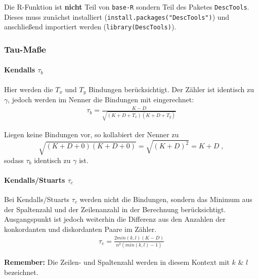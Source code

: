 \documentclass[a4paper]{article}
\newcommand\dangersign{%
 \makebox[1.8em][c]{%
 \makebox[0pt][c]{\raisebox{.15em}{\small!}}%
 \makebox[0pt][c]{\color{red}\Large$\triangle$}}}%
\begin{document}
\noindent \dangersign Die R-Funktion ist \textbf{nicht} Teil von \texttt{base-R} sondern Teil des Paketes \texttt{DescTools}. Dieses muss zunächst installiert (\texttt{install.packages("DescTools")}) und anschließend importiert werden (\texttt{library(DescTools)}).

\clearpage

\subsubsection{Tau-Maße}\label{sec:tau}

\paragraph{Kendalls $\tau_b$}
Hier werden die $T_x$ und $T_y$ Bindungen berücksichtigt. Der Zähler ist identisch zu $\gamma$, jedoch werden im Nenner die Bindungen mit eingerechnet:
\begin{align*}
    \tau_b = \frac{K-D}{\sqrt{(K+D+T_x)(K+D+T_y)}}
\end{align*}

\noindent \dangersign Liegen keine Bindungen vor, so kollabiert der Nenner zu 
$$\sqrt{(K+D+0)(K+D+0)} = \sqrt{(K+D)^2} = K+D\;,$$ sodass $\tau_b$ identisch zu $\gamma$ ist.\\

\noindent  {}

\paragraph{Kendalls/Stuarts $\tau_c$}
Bei Kendalls/Stuarts $\tau_c$ werden nicht die Bindungen, sondern das Minimum aus der Spaltenzahl und der Zeilenanzahl in der Berechnung berücksichtigt. Ausgangspunkt ist jedoch weiterhin die Differenz aus den Anzahlen der konkordanten und diskordanten Paare im Zähler.
\begin{align*}
    \tau_c = \frac{2min(k,l) (K-D)}{n^2(min(k,l)-1)}
\end{align*}

\noindent \dangersign \textbf{Remember:} Die Zeilen- und Spaltenzahl werden in diesem Kontext mit $k$ \& $l$ bezeichnet.\\

\noindent  {}
\end{document}
